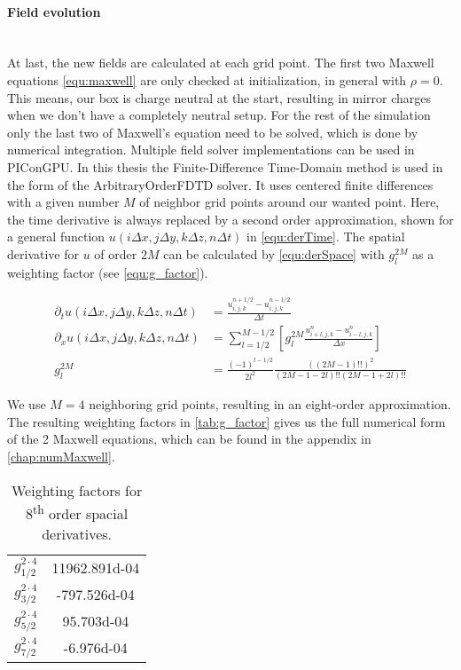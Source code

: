 \documentclass[bachelor_thesis]{subfiles}
\begin{document}
\paragraph*{Field evolution}\hspace{0pt} \\
At last, the new fields are calculated at each grid point. The first two Maxwell equations \autoref{equ:maxwell} are only checked at initialization, in general with $\rho=0$. This means, our box is charge neutral at the start, resulting in mirror charges when we don't have a completely neutral setup.
For the rest of the simulation only the last two of Maxwell's equation need to be solved, which is done by numerical integration. 
Multiple field solver implementations can be used in PIConGPU. In this thesis the Finite-Difference Time-Domain method is used in the form of the ArbitraryOrderFDTD solver. It uses centered finite differences with a given number $M$ of neighbor grid points around our wanted point.
Here, the time derivative is always replaced by a second order approximation, shown for a general function $u(i\Delta x,j\Delta y,k\Delta z,n\Delta t)$ in \autoref{equ:derTime}. The spatial derivative for $u$ of order $2M$ can be calculated by \autoref{equ:derSpace} with $g_l^{2M}$ as a weighting factor (see \autoref{equ:g_factor}).

\begin{align}
\partial_t u(i\Delta x,j\Delta y,k\Delta z,n\Delta t) &= \frac{u_{i,j,k}^{n+1/2} - u_{i,j,k}^{n-1/2}}{\Delta t}								\label{equ:derTime}	\\
\partial_x u(i\Delta x,j\Delta y,k\Delta z,n\Delta t) &=  \sum\limits_{l=1/2}^{M-1/2} \left[ g^{2M}_l \frac{u_{i + l, j, k}^n - u_{i - l, j, k}^n}{\Delta x} \right] 	\label{equ:derSpace}	\\
g^{2M}_l &= \frac{(-1)^{l-1/2}}{2l^2} \frac{((2M-1)!!)^2}{(2M -1 - 2l)!! (2M -1 + 2l)!!}											\label{equ:g_factor}
\end{align}

We use $M=4$ neighboring grid points, resulting in an eight-order approximation. The resulting weighting factors in \autoref{tab:g_factor} gives us the full numerical form of the 2 Maxwell equations, which can be found in the appendix in \autoref{chap:numMaxwell}.
\begin{table}[h]
\begin{center}
\begin{tabular}{ |c|c| }
	\hline
	$g_{1/2}^{2\cdot 4}$ & \num{11962.891d-04} \\ 
	$g_{3/2}^{2\cdot 4}$ & \num{-797.526d-04} \\  
	$g_{5/2}^{2\cdot 4}$ & \num{95.703d-04} \\	
	$g_{7/2}^{2\cdot 4}$ & \num{-6.976d-04} \\
	 \hline
\end{tabular}
\caption{Weighting factors for 8\textsuperscript{th} order spacial derivatives.}\label{tab:g_factor}
\end{center}
\end{table}
\end{document}
